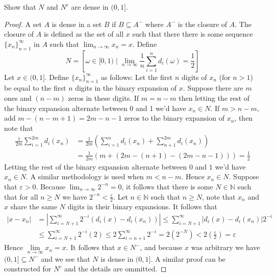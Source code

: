 \documentclass[11pt]{article}
\newcommand{\N}{\mathbb{N}}
\newcommand{\seq}{\subseteq}
\newcommand{\e}{\varepsilon}
\newcommand{\Lim}{\lim\limits}
\newenvironment{exercise}[2][Exercise]{\begin{trivlist}
\item[\hskip \labelsep {\bfseries #1}\hskip \labelsep {\bfseries #2.}]}{\end{trivlist}}
\begin{document}
\begin{exercise}{1.2}
    Show that $N$ and $N^c$ are dense in $(0, 1]$.
\end{exercise}
\begin{proof}
    A set $A$ is dense in a set $B$ if $B \seq A^{-}$ where $A^{-}$ is the closure of $A$. The closure of $A$ is defined as the set of all $x$ such that there there is some sequence $\{ x_{n} \}_{n=1}^{\infty}$ in $A$ such that $\lim_{n \to \infty} x_n = x$. Define \[ N = \left [ \omega \in [0, 1) \mid \lim_{n \to \infty} \frac{1}{n} \sum_{i=1}^{n} d_i (\omega) = \frac{1}{2} \right ] \]
    Let $x \in (0, 1]$. Define $\{ x_{n} \}_{n=1}^{\infty}$ as follows: Let the first $n$ digits of $x_n$ (for $n > 1$) be equal to the first $n$ digits in the binary expansion of $x$. Suppose there are $m$ ones and $(n-m)$ zeros in these digits. If $m = n-m$ then letting the rest of the binary expansion alternate between 0 and 1 we'd have $x_n \in N$. If $m > n-m$, add $m-(n-m+1) = 2m - n - 1$ zeros to the binary expansion of $x_n$, then note that
    \begin{align*}
        \frac{1}{2m} \sum_{i=1}^{2m} d_i (x_n) &= \frac{1}{2m} \left (\sum_{i=1}^{n} d_i (x_n) + \sum_{n+1}^{2m} d_i (x_n) \right) \\
        &= \frac{1}{2m} \left ( m + (2m-(n+1) - (2m-n-1)) \right ) = \frac{1}{2}
    \end{align*}
    Letting the rest of the binary expansion alternate between $0$ and $1$ we'd have $x_n \in N$. A similar methodology is used when $m < n-m$. Hence $x_n \in N$. Suppose that $\e > 0$. Because $\lim_{n \to \infty} 2^{-n} = 0$, it follows that there is some $N \in \N$ such that for all $n \geq N$ we have $2^{-n} < \frac{\e}{2}$. Let $n \in \N$ such that $n \geq N$, note that $x_n$ and $x$ share the same $N$ digits in their binary expansions. It follows that
    \begin{align*}
        |x-x_n| &= \left | \sum_{i=N+1}^{\infty} 2^{-i}  (d_i (x) - d_i(x_n))\right | \leq \sum_{i=N+1}^{\infty} |d_i (x) - d_i (x_n)| 2^{-i} \\
        &\leq \sum_{i=N+1}^{\infty} 2^{-i} (2) \leq 2 \sum_{i=n+1}^{\infty} 2^{-i} = 2(2^{-N}) < 2 \left (\frac{\e}{2} \right) = \e
    \end{align*}
    Hence $\Lim_{n \to \infty} x_n = x$. It follows that $x \in N^{-}$, and because $x$ was arbitrary we have $(0, 1] \seq N^{-}$ and we see that $N$ is dense in $(0, 1]$. A similar proof can be constructed for $N^{c}$ and the details are ommitted.
\end{proof}
\end{document}
